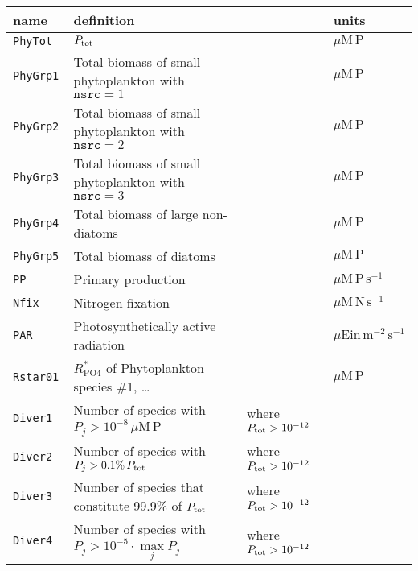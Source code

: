 \documentclass[11pt,letterpaper,english]{article}
\begin{document}
\begin{tabular}{llll}
 name & definition && units \\
\hline
 \texttt{PhyTot  } & $P_{\mathrm{tot}}$                                                        && $\mu\mathrm{M\,P}$ \\
 \texttt{PhyGrp1 } & Total biomass of small phytoplankton with $\texttt{nsrc}=1$    && $\mu\mathrm{M\,P}$ \\
 \texttt{PhyGrp2 } & Total biomass of small phytoplankton with $\texttt{nsrc}=2$    && $\mu\mathrm{M\,P}$ \\
 \texttt{PhyGrp3 } & Total biomass of small phytoplankton with $\texttt{nsrc}=3$    && $\mu\mathrm{M\,P}$ \\
 \texttt{PhyGrp4 } & Total biomass of large non-diatoms                             && $\mu\mathrm{M\,P}$ \\
 \texttt{PhyGrp5 } & Total biomass of diatoms                                       && $\mu\mathrm{M\,P}$ \\
 \texttt{PP      } & Primary production                                             && $\mu\mathrm{M\,P}\, \mathrm{s}^{-1}$ \\
 \texttt{Nfix    } & Nitrogen fixation                                              && $\mu\mathrm{M\,N}\, \mathrm{s}^{-1}$ \\
 \texttt{PAR     } & Photosynthetically active radiation                            && $\mu\mathrm{Ein}\, \mathrm{m}^{-2}\,\mathrm{s}^{-1}$ \\
 \texttt{Rstar01 } & $R^*_{\mathrm{PO4}}$ of Phytoplankton species \#1, \dots       && $\mu\mathrm{M\,P}$ \\
 \texttt{Diver1  } & Number of species with $P_j > 10^{-8}\,\mu\mathrm{M\,P}$       & where $P_{\mathrm{tot}}>10^{-12}$ \\
 \texttt{Diver2  } & Number of species with $P_j > 0.1\%\,  P_{\mathrm{tot}}$                  & where $P_{\mathrm{tot}}>10^{-12}$ \\
 \texttt{Diver3  } & Number of species that constitute 99.9\% of $P_{\mathrm{tot}}$            & where $P_{\mathrm{tot}}>10^{-12}$ \\
 \texttt{Diver4  } & Number of species with $P_j > 10^{-5} \cdot \max\limits_j P_j$ & where $P_{\mathrm{tot}}>10^{-12}$ \\
\end{tabular}

\fi %
\end{document}
